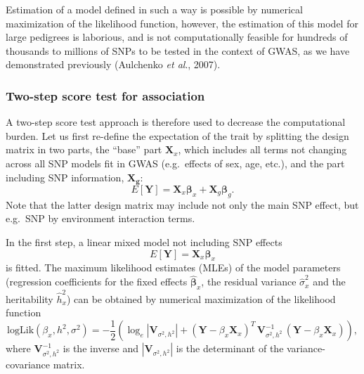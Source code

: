 \documentclass[12pt,a4paper]{article}
\begin{document}
Estimation of a model defined in such a way is possible by numerical
maximization of the likelihood function, however, the estimation of
this model for large pedigrees is laborious, and is not
computationally feasible for hundreds of thousands to millions of SNPs
to be tested in the context of GWAS, as we have demonstrated
previously (Aulchenko \emph{et al}., 2007).

\subsubsection{Two-step score test for association}
A two-step score test approach is therefore used to decrease the
computational burden. Let us first re-define the expectation of the
trait by splitting the design matrix in two parts, the ``base'' part
$\mathbf{X}_x$, which includes all terms not changing across all SNP
models fit in GWAS (e.g.\ effects of sex, age, etc.), and the part
including SNP information, $\mathbf{X_g}$:
$$
E[\mathbf{Y}] = \mathbf{X}_x \boldsymbol{\beta}_x +
\mathbf{X}_g \boldsymbol{\beta}_g.
$$
Note that the latter design matrix may include not only the main SNP
effect, but e.g.\ SNP by environment interaction terms.

In the first step, a linear mixed model not including SNP effects
$$
E[\mathbf{Y}] = \mathbf{X}_x \boldsymbol{\beta}_x
$$
is fitted. The maximum likelihood estimates (MLEs) of the model
parameters (regression coefficients for the fixed effects
$\hat{\boldsymbol{\beta}}_x$, the residual variance $\hat{\sigma}^2_x$ and
the heritability $\hat{h}^2_x$) can be obtained by numerical
maximization of the likelihood function
$$
\mathrm{logLik}(\beta_x,h^2,\sigma^2) = -\frac{1}{2} \left(
  \log_e|\mathbf{V}_{\sigma^2,h^2}| + (\mathbf{Y} - \beta_x
  \mathbf{X}_x)^T \, \mathbf{V}_{\sigma^2,h^2}^{-1} \, (\mathbf{Y} -
  \beta_x \mathbf{X}_x) \right ),
$$
where $\mathbf{V}_{\sigma^2,h^2}^{-1}$ is the inverse and
$|\mathbf{V}_{\sigma^2,h^2}|$ is the determinant of the
variance-covariance matrix.
\end{document}
